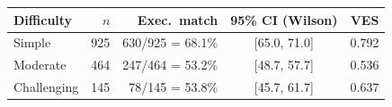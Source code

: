 \begin{tabular}{lrrcc}
\toprule
Difficulty & $n$ & Exec.\ match & 95\% CI (Wilson) & VES \\
\midrule
Simple & 925 & 630/925 = 68.1\% & [65.0, 71.0] & 0.792 \\
Moderate & 464 & 247/464 = 53.2\% & [48.7, 57.7] & 0.536 \\
Challenging & 145 & 78/145 = 53.8\% & [45.7, 61.7] & 0.637 \\
\bottomrule
\end{tabular}

